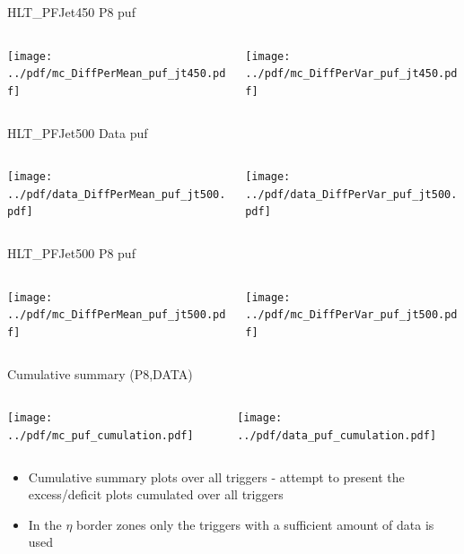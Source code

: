 \documentclass[9pt]{beamer}
\begin{document}
\begin{frame}[t]{HLT\_PFJet450 P8 puf}
\begin{columns}[T]
  \begin{column}{.5\textwidth}
  \texttt{[image: ../pdf/mc\_DiffPerMean\_puf\_jt450.pdf]}
  \end{column}
  \begin{column}{.5\textwidth}
  \texttt{[image: ../pdf/mc\_DiffPerVar\_puf\_jt450.pdf]}
  \end{column}
\end{columns}
\end{frame}

\begin{frame}[t]{HLT\_PFJet500 Data puf}
\begin{columns}[T]
  \begin{column}{.5\textwidth}
  \texttt{[image: ../pdf/data\_DiffPerMean\_puf\_jt500.pdf]}
  \end{column}
  \begin{column}{.5\textwidth}
  \texttt{[image: ../pdf/data\_DiffPerVar\_puf\_jt500.pdf]}
  \end{column}
\end{columns}
\end{frame}

\begin{frame}[t]{HLT\_PFJet500 P8 puf}
\begin{columns}[T]
  \begin{column}{.5\textwidth}
  \texttt{[image: ../pdf/mc\_DiffPerMean\_puf\_jt500.pdf]}
  \end{column}
  \begin{column}{.5\textwidth}
  \texttt{[image: ../pdf/mc\_DiffPerVar\_puf\_jt500.pdf]}
  \end{column}
\end{columns}
\end{frame}

\begin{frame}[t]{Cumulative summary (P8,DATA)}
\begin{columns}[T]
  \begin{column}{.5\textwidth}
  \texttt{[image: ../pdf/mc\_puf\_cumulation.pdf]}
  \end{column}
  \begin{column}{.5\textwidth}
  \texttt{[image: ../pdf/data\_puf\_cumulation.pdf]}
  \end{column}
\end{columns}
\begin{itemize}
 \item Cumulative summary plots over all triggers - attempt to present the excess/deficit plots cumulated over all triggers
 \item In the $\eta$ border zones only the triggers with a sufficient amount of data is used
\end{itemize}
\end{frame}
\end{document}
